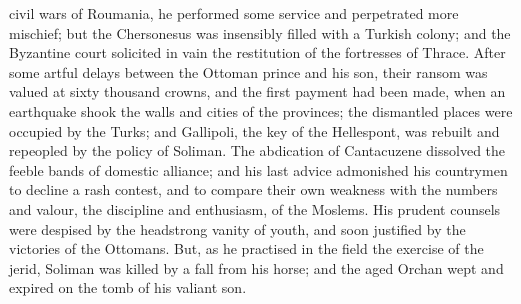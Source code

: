 civil wars of Roumania, he performed some service and perpetrated more mischief; but the Chersonesus was insensibly filled with a Turkish colony; and the Byzantine court solicited in vain the restitution of the fortresses of Thrace. After some artful delays between the Ottoman prince and his son, their ransom was valued at sixty thousand crowns, and the first payment had been made, when an earthquake shook the walls and cities of the provinces; the dismantled places were occupied by the Turks; and Gallipoli, the key of the Hellespont, was rebuilt and repeopled by the policy of Soliman. The abdication of Cantacuzene dissolved the feeble bands of domestic alliance; and his last advice admonished his countrymen to decline a rash contest, and to compare their own weakness with the numbers and valour, the discipline and enthusiasm, of the Moslems. His prudent counsels were despised by the headstrong vanity of youth, and soon justified by the victories of the Ottomans. But, as he practised in the field the exercise of the jerid, Soliman was killed by a fall from his horse; and the aged Orchan wept and expired on the tomb of his valiant son.

